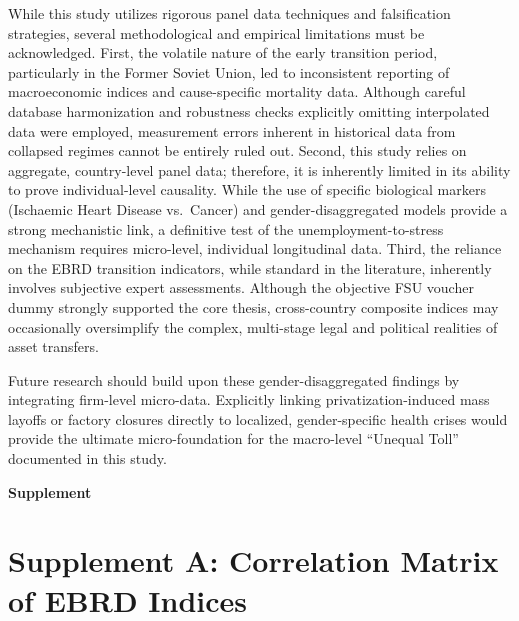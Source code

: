 \documentclass[en,magisterska]{pracamgr}
\begin{document}
While this study utilizes rigorous panel data techniques and falsification strategies, several methodological and empirical limitations must be acknowledged. First, the volatile nature of the early transition period, 
particularly in the Former Soviet Union, led to inconsistent reporting of macroeconomic indices
    and cause-specific mortality data. Although careful database harmonization and robustness checks explicitly omitting interpolated data were employed, measurement errors inherent in historical data from 
    collapsed regimes cannot be entirely ruled out. Second, this study relies on aggregate, country-level panel data; therefore, it is inherently limited in its ability to prove individual-level causality. While the use 
    of specific biological markers (Ischaemic Heart Disease vs.\ Cancer) and gender-disaggregated models provide a strong mechanistic link, a definitive test of the unemployment-to-stress mechanism requires 
    micro-level, individual longitudinal data. Third, the reliance on the EBRD transition indicators, while standard in the literature, inherently involves subjective expert assessments. Although the 
    objective FSU voucher dummy strongly supported the core thesis, cross-country composite indices may occasionally oversimplify the complex, multi-stage legal and political realities of asset transfers.

Future research should build upon these gender-disaggregated findings by integrating firm-level micro-data. Explicitly linking privatization-induced mass layoffs or factory closures directly to localized, 
gender-specific health crises would provide the ultimate micro-foundation for the macro-level ``Unequal Toll'' documented in this study.


\clearpage 
\singlespacing 
\cleardoublepage
{}


\cleardoublepage
\thispagestyle{empty} %
\vspace*{\fill}
\begin{center}
    \Huge \textbf{Supplement}
\end{center}
\vspace*{\fill}
\clearpage


\newpage
\section*{Supplement A: Correlation Matrix of EBRD Indices}
\end{document}

